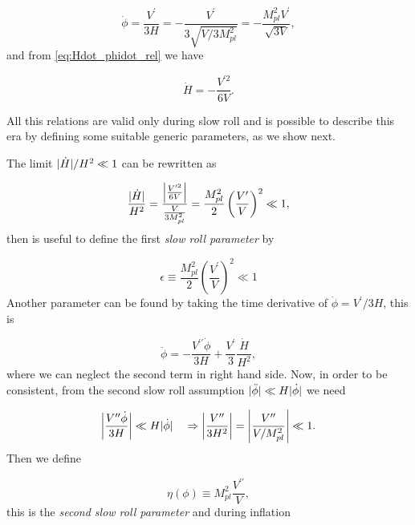 \documentclass[12pt,letterpaper,twoside]{book}
\DeclarePairedDelimiter\abs{\lvert}{\rvert}%
\begin{document}
\begin{equation}
    \dot{\phi}=\frac{V^\prime}{3H} = - \frac{V^\prime}{ 3 \sqrt{V/3 M_{pl}^2}} =
                                     - \frac{ M_{pl}^2 V^\prime}{ \sqrt{3V}},
\end{equation}
and from \eqref{eq:Hdot_phidot_rel} we have

\begin{equation}
    \dot{H}= - \frac{ V^{\prime 2}}{6V}.
\end{equation}

All this relations are valid only during slow roll and is possible to describe
this era by defining some suitable generic parameters, as we show next.

The limit $\abs{ \dot{H}}/ H^2 \ll 1$ can be rewritten as

\begin{equation}
\frac{\abs{\dot{H}}}{H^2} = \frac{ \left| \frac{ V^{\prime 2}}{6V} \right|}{\frac{V}{3 M_{pl}^2}}
                          = \frac{M_{pl}^2}{2} \left(\frac{V^\prime}{V}\right)^2
                          \ll 1,
\end{equation}
then is useful to define the first \textit{slow roll parameter} by

\begin{equation}
    \boxed{\epsilon \equiv \frac{M_{pl}^2}{2} \left(\frac{V^\prime}{V}\right)^2
        \ll 1}
\end{equation}
Another parameter can be found by taking the time derivative of
$\dot{\phi}=V^\prime / 3H$, this is

\begin{equation}
    \ddot{\phi} = - \frac{V^{\prime \prime} \dot{\phi}}{3 H}
                  + \frac{V^\prime}{3} \frac{ \dot{H}}{H^2},
\end{equation}
where we can neglect the second term in right hand side. Now, in order to be
consistent, from the second slow roll assumption $\abs{ \ddot{\phi}}  \ll  H\abs{
    \dot{\phi}}$ we need

\begin{equation}
    \left| \frac{V^{\prime \prime} \dot{\phi}}{3 H} \right| \ll  H\abs{ \dot{\phi}}
    \quad  \Rightarrow \left| \frac{V^{\prime \prime}}{3 H^2} \right|
    = \left| \frac{V^{\prime \prime}}{V/ M_{pl}^2} \right|  \ll 1.
\end{equation}
Then we define

\begin{equation}
    \boxed{\eta(\phi)\equiv M_{pl}^2 \frac{V^{\prime \prime}}{V}},
\end{equation}
this is the \textit{second slow roll parameter} and during inflation
\end{document}
